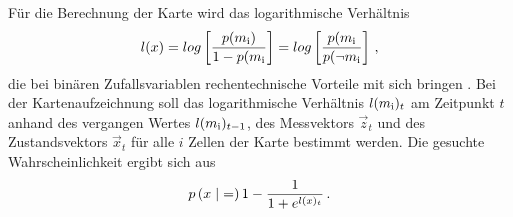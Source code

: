 Für die Berechnung der Karte wird das logarithmische Verhältnis
\begin{equation}
l(x) = log\left[ \frac{p(m_{\text{i}})}{1-p(m_{\text{i}}} \right] = log\left[ \frac{p(m_{\text{i}}}{p(\neg m_{\text{i}}} \right]\,,
\end{equation}
die bei binären Zufallsvariablen  rechentechnische Vorteile mit sich bringen  \cite[S. 94 f]{ProbRob}. Bei der Kartenaufzeichnung soll das logarithmische Verhältnis $l(m_{\text{i}})_t$ am Zeitpunkt $t$ anhand des vergangen Wertes $l(m_{\text{i}})_{t-1}$, des Messvektors $\vec{z}_t$ und des Zustandsvektors $\vec{x}_t$ für alle $i$ Zellen der Karte bestimmt werden. Die gesuchte Wahrscheinlichkeit ergibt sich aus
\begin{equation}
p\left({x} \hspace{1mm} \vert \hspace{1mm} {=}\right) 1 - \frac{1}{1+e^{l(x)_t}}\,.
\end{equation}

